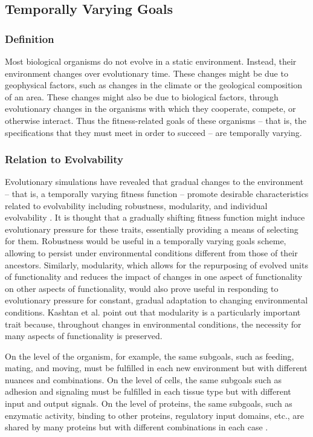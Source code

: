 \subsection{Temporally Varying Goals} \label{sec:tvg}
\subsubsection{Definition}
Most biological organisms do not evolve in a static environment. Instead, their environment changes over evolutionary time. These changes might be due to geophysical factors, such as changes in the climate or the geological composition of an area. These changes might also be due to biological factors, through evolutionary changes in the organisms with which they cooperate, compete, or otherwise interact. Thus the fitness-related goals of these organisms -- that is, the specifications that they must meet in order to succeed -- are temporally varying.

\subsubsection{Relation to Evolvability}

Evolutionary simulations have revealed that gradual changes to the environment  -- that is, a temporally varying fitness function -- promote desirable characteristics related to evolvability including robustness, modularity, and individual evolvability \cite{Kashtan2007VaryingEvolution, Wilder2015ReconcilingEvolvability}. It is thought that a gradually shifting fitness function might induce evolutionary pressure for these traits, essentially providing a means of selecting for them. Robustness would be useful in a temporally varying goals scheme, allowing to persist under environmental conditions different from those of their ancestors.\mindmapmark{\robustnesstemporallyvaryinggoals} Similarly, modularity, which allows for the repurposing of evolved units of functionality and reduces the impact of changes in one aspect of functionality on other aspects of functionality, would also prove useful in responding to evolutionary pressure for constant, gradual adaptation to changing environmental conditions.\mindmapmark{\modularitytemporallyvaryinggoals} Kashtan et al. point out that modularity is a particularly important trait because, throughout changes in environmental conditions, the necessity for many aspects of functionality is preserved.

\begin{displayquote}
On the level of the organism, for example, the same subgoals, such as feeding, mating, and moving, must be fulfilled in each new environment but with different nuances and combinations. On the level of cells, the same subgoals such as adhesion and signaling must be fulfilled in each tissue type but with different input and output signals. On the level of proteins, the same subgoals, such as enzymatic activity, binding to other proteins, regulatory input domains, etc., are shared by many proteins but with different combinations in each case \cite{Kashtan2007VaryingEvolution}.
\end{displayquote}

